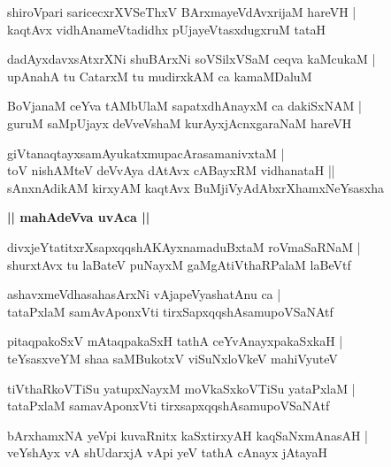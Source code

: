 \documentclass[twoside,12pt,openright]{book}
\newcounter{shloka}[chapter]
\def\uvaca#1{\centerline{{\large\textbf{#1}}}}
\begin{document}
\begin{shloka}%
shiroVpari saricecxrXVSeThxV BArxmayeVdAvxrijaM hareVH |\\
kaqtAvx vidhAnameVtadidhx pUjayeVtasxdugxruM tataH 
\end{shloka}

\begin{shloka}%
dadAyxdavxsAtxrXNi shuBArxNi soVSilxVSaM ceqva kaMcukaM |\\
upAnahA tu CatarxM tu mudirxkAM ca kamaMDaluM
\end{shloka}

\begin{shloka}%
BoVjanaM ceYva tAMbUlaM sapatxdhAnayxM ca dakiSxNAM |\\
guruM saMpUjayx deVveVshaM kurAyxjAcnxgaraNaM hareVH 
\end{shloka}

\begin{shloka}%
giVtanaqtayxsamAyukatxmupacArasamanivxtaM |\\
toV nishAMteV deVvAya dAtAvx cABayxRM vidhanataH ||\\
sAnxnAdikAM kirxyAM kaqtAvx BuMjiVyAdAbxrXhamxNeYsasxha
\end{shloka}

\uvaca{|| mahAdeVva uvAca ||}

\begin{shloka}%
divxjeYtatitxrXsapxqqshAKAyxnamaduBxtaM roVmaSaRNaM |\\
shurxtAvx tu laBateV puNayxM gaMgAtiVthaRPalaM laBeVtf
\end{shloka}

\begin{shloka}%
ashavxmeVdhasahasArxNi vAjapeVyashatAnu ca |\\
tataPxlaM samAvAponxVti tirxSapxqqshAsamupoVSaNAtf 
\end{shloka}

\begin{shloka}%
pitaqpakoSxV mAtaqpakaSxH tathA ceYvAnayxpakaSxkaH |\\
teYsasxveYM shaa saMBukotxV viSuNxloVkeV mahiVyuteV 
\end{shloka}

\begin{shloka}%
tiVthaRkoVTiSu yatupxNayxM moVkaSxkoVTiSu yataPxlaM |\\
tataPxlaM samavAponxVti tirxsapxqqshAsamupoVSaNAtf
\end{shloka}

\begin{shloka}%
bArxhamxNA yeVpi kuvaRnitx kaSxtirxyAH kaqSaNxmAnasAH |\\
veYshAyx vA shUdarxjA vApi yeV tathA cAnayx jAtayaH
\end{shloka}
\end{document}
